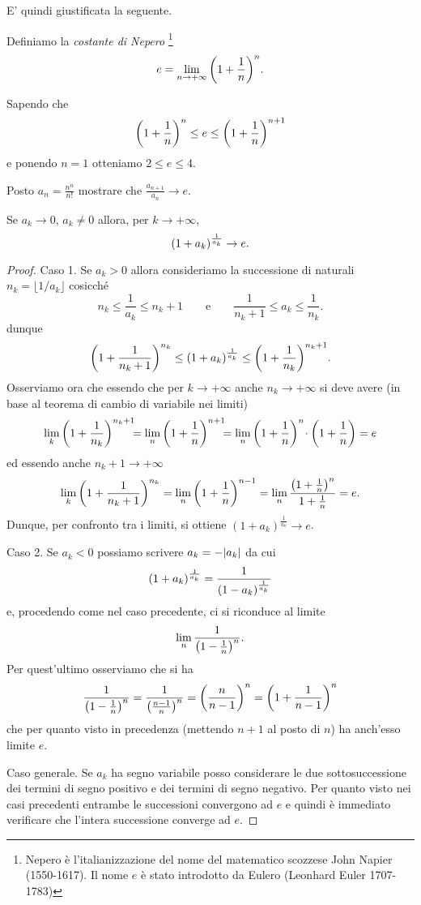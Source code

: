 E' quindi giustificata la seguente.

\begin{definition}
\mymark{***}
Definiamo la \emph{costante di Nepero}%
%
%
%
\footnote{Nepero è l'italianizzazione del nome del
matematico scozzese John Napier (1550-1617).
Il nome $e$ è stato introdotto da Eulero (Leonhard Euler 1707-1783)
}
\[
  e = \lim_{n\to +\infty} {\left( 1+\frac 1 n \right)}^n.
\]
\end{definition}

Sapendo che
\[
  {\left( 1+\frac 1 n \right)}^n \le e \le {\left( 1+\frac 1 n \right)}^{n+1}
\]
e ponendo $n=1$ otteniamo $2\le e \le 4$.

\begin{exercise}\label{ex:4876765}
Posto $a_n = \frac{n^n}{n!}$ mostrare che $\frac{a_{n+1}}{a_n} \to e$.
\end{exercise}

\begin{theorem}
Se $a_k \to 0$, $a_k\neq 0$ allora, per $k\to +\infty$,
\[
  {\left( 1+a_k \right)}^{\frac 1 {a_k}} \to e.
\]
\end{theorem}
%
\begin{proof}
Caso 1. Se $a_k > 0$ allora consideriamo la successione di naturali
$n_k = \lfloor 1/a_k \rfloor$ cosicché
\[
  n_k \le \frac{1}{a_k} \le n_k + 1
\qquad
\text{e}
\qquad
 \frac{1}{n_k+1} \le a_k \le \frac 1 {n_k}.
\]
dunque
\[
{\left( 1+\frac 1 {n_k+1}  \right)}^{n_k}
  \le {\left( 1+a_k \right)}^{\frac 1 {a_k}}
  \le {\left( 1+\frac 1 {n_k} \right)}^{n_k + 1}.
\]
Osserviamo ora che essendo che per $k\to +\infty$ anche
$n_k \to +\infty$ si deve
avere (in base al teorema di cambio di variabile nei limiti)
\[
 \lim_k {\left( 1 + \frac{1} {n_k} \right)}^{n_k+1}\!\!\!
 = \lim_n {\left( 1+ \frac 1 n \right)}^{n+1}\!\!\!
 = \lim_n {\left( 1+ \frac 1 n \right)}^n\!\cdot{\left( 1+\frac 1 n \right)}
 = e
\]
ed essendo anche $n_k + 1 \to +\infty$
\[
  \lim_k {\left( 1 + \frac 1 {n_k+1} \right)}^{n_k}
  = \lim_n {\left( 1+\frac 1 n \right)}^{n-1}
  = \lim_n \frac{{\left( 1+\frac 1 n \right)}^{n}}{1+\frac 1 n}
  = e.
\]
Dunque, per confronto tra i limiti, si ottiene $(1+a_k)^{\frac 1 {a_k}}\to e$.

Caso 2. Se $a_k<0$ possiamo scrivere $a_k = -{\left|a_k\right|}$ da cui
\[
  {\left( 1+a_k \right)}^{\frac 1 {a_k}}
  = \frac{1}{{\left( 1-a_k \right)}^{\frac 1{a_k}}}
\]
e, procedendo come nel caso precedente, ci si riconduce al limite
\[
  \lim_n \frac{1}{{\left( 1-\frac 1 n \right)}^n}.
\]
Per quest'ultimo osserviamo che si ha
\[
 \frac{1}{{\left( 1-\frac 1 n \right)}^n}
 = \frac{1}{{\left( \frac{n-1}{n} \right)}^n}
 = {\left( \frac{n}{n-1} \right)}^n
 = {\left( 1 + \frac{1}{n-1} \right)}^n
\]
che per quanto visto in precedenza (mettendo $n+1$ al posto di $n$)
ha anch'esso limite $e$.

Caso generale. Se $a_k$ ha segno variabile posso considerare
le due sottosuccessione dei termini di segno positivo e dei termini di segno
negativo. Per quanto visto nei casi precedenti entrambe le successioni
convergono ad $e$ e quindi è immediato verificare che l'intera
successione converge ad $e$.
\end{proof}

